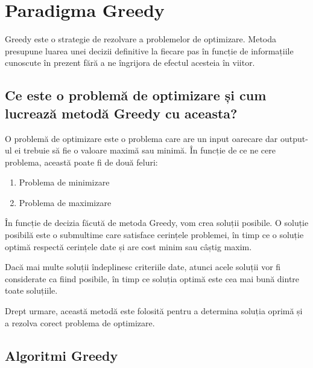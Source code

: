 \chapter{Paradigma Greedy}
Greedy este o strategie de rezolvare a problemelor de optimizare. Metoda presupune luarea unei decizii definitive la fiecare pas în funcție de informațiile cunoscute în prezent fără a ne îngrijora de efectul acesteia în viitor.


\section{Ce este o problemă de optimizare și cum lucrează metodă Greedy cu aceasta?}

O problemă de optimizare este o problema care are un input oarecare dar output-ul ei trebuie să fie o valoare maximă sau minimă.
În funcție de ce ne cere problema, această poate fi de două feluri: 
\begin{enumerate}
	\item Problema de minimizare 
	\par
	\par
	\item Problema de maximizare
	\par
\end{enumerate}

În funcție de decizia făcută de metoda Greedy, vom crea soluții posibile. O soluție posibilă este o submultime care satisface cerințele problemei, în timp ce o soluție optimă respectă cerințele date și are cost minim sau câștig maxim.
\par 
Dacă mai multe soluții îndeplinesc criteriile date, atunci acele soluții vor fi considerate ca fiind posibile, în timp ce soluția optimă este cea mai bună dintre toate soluțiile.
\par 
Drept urmare, această metodă este folosită pentru a determina
soluția oprimă și a rezolva corect problema de optimizare.


\section{Algoritmi Greedy}
